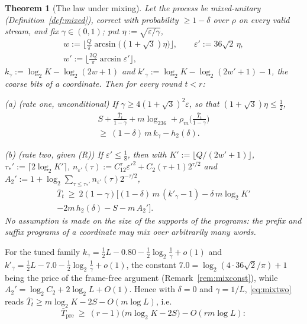 \documentclass[aps,prx,twocolumn,superscriptaddress,nofootinbib,longbibliography]{revtex4-2}
\theoremstyle{plain}
\newtheorem{theorem}{Theorem}
\theoremstyle{definition}
\theoremstyle{remark}
\newcommand{\Tpre}{T_{\mathrm{pre}}}
\begin{document}
\begin{theorem}[The law under mixing]\label{thm:mixing}
Let the process be mixed-unitary (Definition~\ref{def:mixed}), correct with probability $\ge1-\delta$ over $\rho$ on every valid stream, and fix $\gamma\in(0,1)$; put $\eta:=\sqrt{\varepsilon/\gamma}$,
\[
\begin{gathered}
w:=\Big\lfloor\tfrac Q\pi\arcsin\big((1+\sqrt3)\eta\big)\Big\rfloor,\qquad
\varepsilon':=36\sqrt2\,\eta,\\
w':=\Big\lfloor\tfrac{2Q}\pi\arcsin\varepsilon'\Big\rfloor,
\end{gathered}
\]
$k_\gamma:=\log_2K-\log_2(2w+1)$ and $k'_\gamma:=\log_2K-\log_2(2w'+1)-1$, the \emph{coarse bits} of a coordinate. Then for every round $t<r$:

(a) \emph{(rate one, unconditional)} If $\gamma\ge4(1+\sqrt3)^2\varepsilon$, so that $(1+\sqrt3)\eta\le\tfrac12$,
\begin{multline}\label{eq:mixone}
S+\frac{\bar T_t}{1-\gamma}+m\log_236+\rho_m\!\Big(\frac{\bar T_t}{1-\gamma}\Big)\\ \ge\ (1-\delta)\,m\,k_\gamma-h_2(\delta).
\end{multline}

(b) \emph{(rate two, given (R))} If $\varepsilon'\le\tfrac18$, then with $K':=\lfloor Q/(2w'+1)\rfloor$, $\tau_*':=\lceil2\log_2K'\rceil$, $n_{\varepsilon'}(\tau):=C_12^\tau\varepsilon'^2+C_2(\tau+1)2^{\tau/2}$ and $A_2':=1+\log_2\sum_{\tau\le\tau_*'}n_{\varepsilon'}(\tau)2^{-\tau/2}$,
\begin{multline}\label{eq:mixtwo}
\bar T_t\ \ge\ 2(1-\gamma)\big[(1-\delta)\,m\,(k'_\gamma-1)-\delta\,m\log_2K'\\-2m\,h_2(\delta)-S-m\,A_2'\big].
\end{multline}
No assumption is made on the size of the supports of the programs: the prefix and suffix programs of a coordinate may mix over arbitrarily many words.
\end{theorem}
For the tuned family $k_\gamma=\tfrac12L-0.80-\tfrac12\log_2\tfrac1\gamma+o(1)$ and $k'_\gamma=\tfrac12L-7.0-\tfrac12\log_2\tfrac1\gamma+o(1)$, the constant $7.0=\log_2(4\cdot36\sqrt2/\pi)+1$ being the price of the frame-free argument (Remark~\ref{rem:mixconst}), while $A_2'=\log_2C_2+2\log_2L+O(1)$. Hence with $\delta=0$ and $\gamma=1/L$, \eqref{eq:mixtwo} reads $\bar T_t\ge m\log_2K-2S-O(m\log L)$, i.e.
\begin{equation}\label{eq:mixfloor}
\bar\Tpre\ \ge\ (r-1)\big(m\log_2K-2S\big)-O(rm\log L):
\end{equation}
\end{document}
